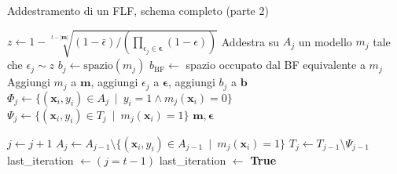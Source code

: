 \begin{algorithm}[ht]
\caption{Addestramento di un FLF, schema completo (parte 2)}
\begin{algorithmic}[1]

        \Else
            \State {}
                \State $z \gets 1- \sqrt[t-|\mathbf{m}|]{(1- \bar \epsilon)/(\prod_{\epsilon_j \in \boldsymbol{\epsilon}}(1-\epsilon))}$
            \EndIf
            \State Addestra su $A_j$ un modello $m_j$ tale che $\epsilon_j \sim z$
            \State $b_j \gets \text{spazio}(m_j)$
            \State $b_{\text{BF}} \gets$ spazio occupato dal BF equivalente a $m_j$
                \State Aggiungi $m_j$ a $\mathbf{m}$, aggiungi $\epsilon_j$ a $\boldsymbol{\epsilon}$, aggiungi $b_j$ a $\mathbf{b}$
                \State $\Phi_j \gets \{ (\mathbf{x}_i, y_i) \in A_j \enspace | \enspace y_i = 1 \wedge m_j(\mathbf{x}_i)=0 \}$
                \State $\Psi_j \gets \{(\mathbf{x}_i, y_i) \in T_j \enspace | \enspace m_j(\mathbf{x}_i)=1 \}$
                    \State \Return $\mathbf{m}, \boldsymbol{\epsilon}$
                \EndIf
                
                \State $j \gets j+1$
                \State $A_j \gets A_{j-1} \setminus \{ (\mathbf{x}_i, y_i) \in A_{j-1} \enspace | \enspace m_j(\mathbf{x}_i)=1 \}$
                \State $T_j \gets T_{j-1} \setminus \Psi_{j-1}$ 
                \State last\_iteration $\gets (j=t-1)$ 
            \Else
                \State last\_iteration $\gets$ \textbf{True}
            \EndIf
        \EndIf
    \EndWhile
\end{algorithmic}
\label{alg:addestramento-catena-completo-2}
\end{algorithm}
